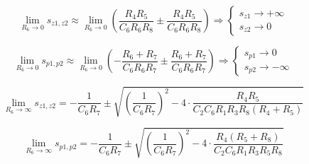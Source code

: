 \begin{equation}
	\lim_{R_6\to 0} s_{z1,z2} \approx \lim_{R_6\to 0}\left( \frac{R_4 R_5}{C_6 R_6 R_8} \pm \frac{R_4 R_5}{C_6 R_6 R_8}\right) \Rightarrow 
	\begin{cases} 
	s_{z1} \to +\infty\\
	s_{z2} \to 0
	\end{cases}
\end{equation}

\begin{equation}
	\lim_{R_6\to 0} s_{p1,p2} \approx 	\lim_{R_6\to 0} \left( -\frac{R_6 + R_7}{C_6 R_6 R_7} \pm \frac{R_6 + R_7}{C_6 R_6 R_7} \right) \Rightarrow
	\begin{cases} 
	s_{p1} \to 0\\
	s_{p2} \to -\infty
	\end{cases}
\end{equation}

\begin{equation}
\lim_{R_6\to\infty}s_{z1,z2} =  -\frac{1}{C_6 R_7} \pm \sqrt{\left(\frac{1}{C_6 R_7} \right)^2 - 4 \cdot \frac{R_4 R_5}{C_2 C_6 R_1 R_3 R_8(R_4 + R_5)}}
\end{equation}

\begin{equation}
\lim_{R_6\to\infty}s_{p1,p2} =  - \frac{1}{C_6 R_7} \pm \sqrt{\left(\frac{1}{C_6 R_7}\right)^2 - 4 \cdot \frac{R_4 (R_5 + R_8)}{C_2 C_6 R_1 R_3 R_5 R_8 }}
\end{equation}

